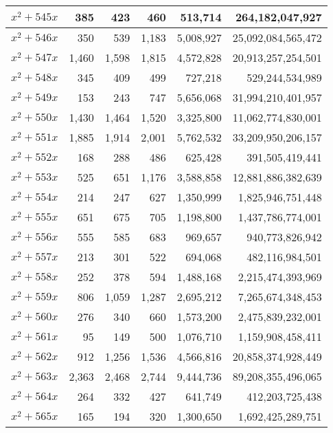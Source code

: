 \documentclass[a4paper]{amsproc}
\theoremstyle{plain}
\theoremstyle{named}
\begin{document}
\begin{longtable}{ | l | r | r | r | r | r | }
$x^2 + 545x$ & 385 & 423 & 460 & 513{,}714 & 264{,}182{,}047{,}927 \\ \hline
$x^2 + 546x$ & 350 & 539 & 1{,}183 & 5{,}008{,}927 & 25{,}092{,}084{,}565{,}472 \\ \hline
$x^2 + 547x$ & 1{,}460 & 1{,}598 & 1{,}815 & 4{,}572{,}828 & 20{,}913{,}257{,}254{,}501 \\ \hline
$x^2 + 548x$ & 345 & 409 & 499 & 727{,}218 & 529{,}244{,}534{,}989 \\ \hline
$x^2 + 549x$ & 153 & 243 & 747 & 5{,}656{,}068 & 31{,}994{,}210{,}401{,}957 \\ \hline
$x^2 + 550x$ & 1{,}430 & 1{,}464 & 1{,}520 & 3{,}325{,}800 & 11{,}062{,}774{,}830{,}001 \\ \hline
$x^2 + 551x$ & 1{,}885 & 1{,}914 & 2{,}001 & 5{,}762{,}532 & 33{,}209{,}950{,}206{,}157 \\ \hline
$x^2 + 552x$ & 168 & 288 & 486 & 625{,}428 & 391{,}505{,}419{,}441 \\ \hline
$x^2 + 553x$ & 525 & 651 & 1{,}176 & 3{,}588{,}858 & 12{,}881{,}886{,}382{,}639 \\ \hline
$x^2 + 554x$ & 214 & 247 & 627 & 1{,}350{,}999 & 1{,}825{,}946{,}751{,}448 \\ \hline
$x^2 + 555x$ & 651 & 675 & 705 & 1{,}198{,}800 & 1{,}437{,}786{,}774{,}001 \\ \hline
$x^2 + 556x$ & 555 & 585 & 683 & 969{,}657 & 940{,}773{,}826{,}942 \\ \hline
$x^2 + 557x$ & 213 & 301 & 522 & 694{,}068 & 482{,}116{,}984{,}501 \\ \hline
$x^2 + 558x$ & 252 & 378 & 594 & 1{,}488{,}168 & 2{,}215{,}474{,}393{,}969 \\ \hline
$x^2 + 559x$ & 806 & 1{,}059 & 1{,}287 & 2{,}695{,}212 & 7{,}265{,}674{,}348{,}453 \\ \hline
$x^2 + 560x$ & 276 & 340 & 660 & 1{,}573{,}200 & 2{,}475{,}839{,}232{,}001 \\ \hline
$x^2 + 561x$ & 95 & 149 & 500 & 1{,}076{,}710 & 1{,}159{,}908{,}458{,}411 \\ \hline
$x^2 + 562x$ & 912 & 1{,}256 & 1{,}536 & 4{,}566{,}816 & 20{,}858{,}374{,}928{,}449 \\ \hline
$x^2 + 563x$ & 2{,}363 & 2{,}468 & 2{,}744 & 9{,}444{,}736 & 89{,}208{,}355{,}496{,}065 \\ \hline
$x^2 + 564x$ & 264 & 332 & 427 & 641{,}749 & 412{,}203{,}725{,}438 \\ \hline
$x^2 + 565x$ & 165 & 194 & 320 & 1{,}300{,}650 & 1{,}692{,}425{,}289{,}751 \\ \hline

\end{longtable}
\end{document}
